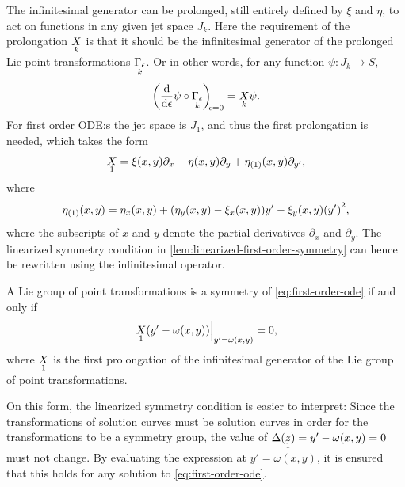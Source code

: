 The infinitesimal generator can be prolonged, still entirely defined by \(\xi\) and \(\eta\), to act on functions in any given jet space \(J_k\).
Here the requirement of the prolongation \(\prolong{X}{k}\) is that it should be the infinitesimal generator of the prolonged Lie point transformations \(\prolong{\Gamma_\epsilon}{k}\).
Or in other words, for any function \(\psi: J_k \to S\),
\begin{equation*}
  \diff*{\psi \circ \prolong{\Gamma_\epsilon}{k}}{\epsilon}[\epsilon = 0] = \prolong{X}{k} \psi.
\end{equation*}
For first order ODE:s the jet space is \(J_1\), and thus the first prolongation is needed, which takes the form
\begin{equation*}
  \prolong{X}{1} =
  \xi(x,y) \partial_x + \eta(x,y) \partial_y + \prolongpart{\eta}{1}(x,y) \partial_{y'},
\end{equation*}
where
\begin{equation*}
  \prolongpart{\eta}{1}(x,y) =
  \eta_x(x,y) + (\eta_y(x,y) - \xi_x(x,y)) y' - \xi_y(x,y) \left(y'\right)^2,
\end{equation*}
where the subscripts of \(x\) and \(y\) denote the partial derivatives \(\partial_x\) and \(\partial_y\).
The linearized symmetry condition in \cref{lem:linearized-first-order-symmetry} can hence be rewritten using the infinitesimal operator.
\begin{lem} \label{lem:linearized-first-order-symmetry-infinitesimal}
  A Lie group of point transformations is a symmetry of \cref{eq:first-order-ode} if and only if
  \begin{equation} \label{eq:linearized-first-order-symmetry}
    \eval{\prolong{X}{1}\left(y' - \omega(x,y)\right)}_{y' = \omega(x,y)} = 0,
  \end{equation}
  where \(\prolong{X}{1}\) is the first prolongation of the infinitesimal generator of the Lie group of point transformations.
\end{lem}
On this form, the linearized symmetry condition is easier to interpret:
Since the transformations of solution curves must be solution curves in order for the transformations to be a symmetry group, the value of \(\Delta(\prolong{z}{1}) = y' - \omega(x,y) = 0\) must not change.
By evaluating the expression at \(y' = \omega(x,y)\), it is ensured that this holds for any solution to \cref{eq:first-order-ode}.

